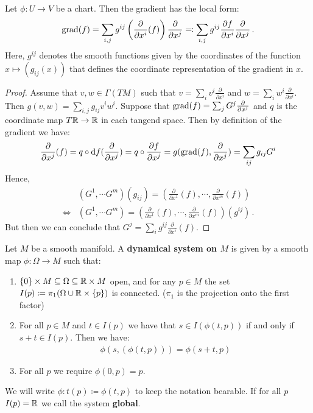 \begin{lemma}
	Let $\phi:U\to V$ be a chart. Then the gradient has the local form:
	\begin{align*}
		\mathrm{grad}(f) =\sum_{i,j}g^{ij}  \left( \frac{\partial }{\partial x^i} (f) \right) \frac{\partial }{\partial x^j} \eqcolon \sum_{i,j}g^{ij} \frac{\partial f}{\partial x^i}  \frac{\partial }{\partial x^j} \, .
	\end{align*}
	Here, $g^{ij}$ denotes the smooth functions given by the coordinates of the function $x\mapsto (g_{ij}(x))$ that defines the coordinate representation of the gradient in $x$. 
\end{lemma}
\begin{proof} Assume that $v,w\in \Gamma( TM)$ such that $v=\sum_i v^i\frac{\partial	}{\partial x^i}$ and $w=\sum_i w^i\frac{\partial	}{\partial x^i}$. Then  $g(v,w)=\sum_{i,j} g_{ij} v^i w^i$.
	Suppose that $\mathrm{grad}(f)=\sum_j G^j \frac{\partial}{\partial x^j}$ and $q$ is the coordinate map $T\mathbb{R}\to \mathbb{R}$ in each tangend space. Then by definition of the gradient we have:
	\begin{align*}
		\frac{\partial }{\partial x^j}(f)=	q \circ \mathop{}\!\mathrm{d} f (\frac{\partial }{\partial x^j})=q\circ \frac{\partial f}{\partial x^j}= g(\mathrm{grad}(f),\frac{\partial }{\partial x^j})= \sum_{ij}g_{ij} G^i
	\end{align*} Hence, 
	\begin{align*}
		&(G^1,\cdots G^m)(g_{ij})=\left(\frac{\partial }{\partial x^1} (f),\cdots,\frac{\partial }{\partial x^m} (f)  \right) \\
		\Leftrightarrow &(G^1,\cdots G^m)=\left(\frac{\partial }{\partial x^1} (f),\cdots,\frac{\partial }{\partial x^m} (f)  \right) (g^{ij})\, .
	\end{align*}  But then we can conclude that $G^j=\sum_i g^{ij}\frac{\partial }{\partial x^i} (f)$.
	
\end{proof}
\begin{definition}
	Let $M$ be a smooth manifold. A \textbf{dynamical system on $M$} is given by a smooth map $\phi:\Omega \to M$ such that:
	\begin{enumerate}
		\item $\{0\}\times M \subseteq \Omega \subseteq \mathbb{R} \times M$ open, and for any $p\in M$ the set $I(p)\coloneq \pi_1(\Omega\cup \mathbb{R}\times \{p\})$ is connected. ($\pi_1$ is the projection onto the first factor)
		\item For all $p\in M$ and $t\in I(p)$ we have that $s\in I(\phi(t,p))$ if and only if $s+t\in I(p)$. Then we have:
		\begin{align*}
			\phi(s,(\phi(t,p)))=\phi(s+t,p)
		\end{align*} 
		\item For all $p$ we require $\phi(0,p)=p$. 
	\end{enumerate}
	We will write $\phi:t(p)\coloneq \phi(t,p)$ to keep the notation bearable. 
	If for all $p$ $I(p)=\mathbb{R}$ we call the system \textbf{global}. 
\end{definition}

